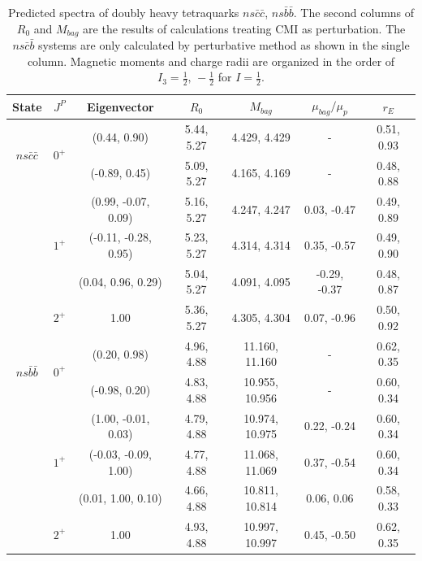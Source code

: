 \documentclass[prd,twocolumn,floatfix,nofootinbib]{revtex4}
\begin{document}
\renewcommand{\tabcolsep}{0.46cm}
\renewcommand{\arraystretch}{1.3}
\begin{table}[!htbp]
    \caption{Predicted spectra of doubly heavy tetraquarks $ns\bar{c}\bar{c}$, $ns\bar{b}\bar{b}$. 
    The second columns of $R_{0}$ and $M_{bag}$ are the results of calculations treating CMI as perturbation. 
    The $ns\bar{c}\bar{b}$ systems are only calculated by perturbative method as shown in the single column. 
    Magnetic moments and charge radii are organized in the order of $I_{3}=\frac{1}{2},\,-\frac{1}{2}$ for $I=\frac{1}{2}$.}
    \label{tab:2heavytetraquark1/2}
    \begin{tabular}{ccccccc}
        \hline\hline
        {\rm State}     &$J^{P}$    &{\rm Eigenvector}      &$R_{0}$        &$M_{bag}$          &$\mu_{bag}/\mu_{p}$    &$r_{E}$ \\ \hline
        \multirow{2}{*}{$ns\bar{c}\bar{c}$}
                        &\multirow{2}{*}{$0^{+}$}
                                    &(0.44, 0.90)           &5.44, 5.27	    &4.429, 4.429	    &-                      &0.51, 0.93 \\
                        &           &(-0.89, 0.45)          &5.09, 5.27	    &4.165, 4.169	    &-                      &0.48, 0.88 \\
                        &\multirow{3}{*}{$1^{+}$}
                                    &(0.99, -0.07, 0.09)    &5.16, 5.27	    &4.247, 4.247	    &0.03, -0.47            &0.49, 0.89 \\
                        &           &(-0.11, -0.28, 0.95)   &5.23, 5.27	    &4.314, 4.314	    &0.35, -0.57            &0.49, 0.90 \\
                        &           &(0.04, 0.96, 0.29)     &5.04, 5.27	    &4.091, 4.095	    &-0.29, -0.37           &0.48, 0.87 \\
                        &$2^{+}$    &1.00                   &5.36, 5.27	    &4.305, 4.304	    &0.07, -0.96            &0.50, 0.92 \\
        \multirow{2}{*}{$ns\bar{b}\bar{b}$}
                        &\multirow{2}{*}{$0^{+}$}
                                    &(0.20, 0.98)           &4.96, 4.88	    &11.160, 11.160	    &-                      &0.62, 0.35 \\
                        &           &(-0.98, 0.20)          &4.83, 4.88	    &10.955, 10.956	    &-                      &0.60, 0.34 \\
                        &\multirow{3}{*}{$1^{+}$}
                                    &(1.00, -0.01, 0.03)    &4.79, 4.88	    &10.974, 10.975	    &0.22, -0.24            &0.60, 0.34 \\
                        &           &(-0.03, -0.09, 1.00)   &4.77, 4.88	    &11.068, 11.069	    &0.37, -0.54            &0.60, 0.34 \\
                        &           &(0.01, 1.00, 0.10)     &4.66, 4.88	    &10.811, 10.814	    &0.06, 0.06             &0.58, 0.33 \\
                        &$2^{+}$    &1.00                   &4.93, 4.88	    &10.997, 10.997	    &0.45, -0.50            &0.62, 0.35 \\


\end{tabular}
\end{table}
\end{document}

